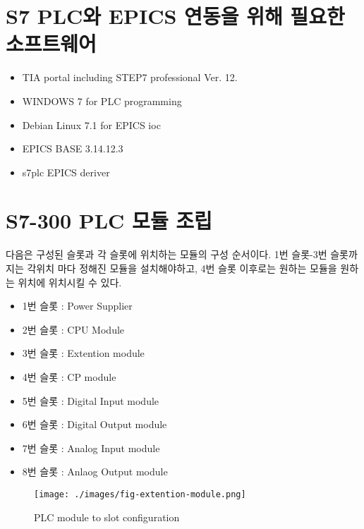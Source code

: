 \documentclass[11pt
  , a4paper
  , article
  , oneside
]{memoir}
\begin{document}
\section{S7 PLC와 EPICS 연동을 위해 필요한 소프트웨어}

\begin{itemize}
\item TIA portal including STEP7 professional Ver. 12.
\item WINDOWS 7 for PLC programming
\item Debian Linux 7.1 for EPICS ioc
\item EPICS BASE 3.14.12.3 \citep{EPIS_HOME}
\item s7plc EPICS deriver \citep{S7PLC_Driver_HOME}
\end{itemize}


\section{S7-300 PLC 모듈 조립}

다음은 구성된 슬롯과 각 슬롯에 위치하는 모듈의 구성 순서이다. 1번 슬롯-3번 슬롯까지는 각위치 마다 정해진 모듈을 설치해야하고, 4번 슬롯 이후로는 원하는 모듈을 원하는 위치에 위치시킬 수 있다.

\begin{itemize}
\item 1번 슬롯 : Power Supplier
\item 2번 슬롯 : CPU Module
\item 3번 슬롯 : Extention module 
\item 4번 슬롯 : CP module
\item 5번 슬롯 : Digital Input module
\item 6번 슬롯 : Digital Output module
\item 7번 슬롯 : Analog Input module
\item 8번 슬롯 : Anlaog Output module
\end{itemize}


\begin{figure}[!htb]
  \centering
  \texttt{[image: ./images/fig-extention-module.png]}
  \caption{
            PLC module to slot configuration 
          }
  \label{fig:}
\end{figure}
\end{document}
